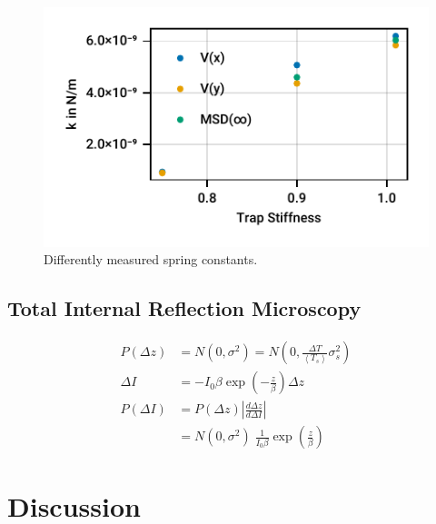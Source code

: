 \documentclass[
    parskip=half, 
    twoside=false,
    twocolumn=true,
    fontsize=11pt,
]{scrarticle}
\begin{document}
\begin{figure}
    \centering
    \includegraphics{figures/01_03_4_spring_constants.pdf}
    \caption{Differently measured spring constants.}
\end{figure}

\clearpage
\subsection{Total Internal Reflection Microscopy}
\begin{align}
    P(\Delta z) &= N(0, \sigma^2) = N\left(0, \frac{\Delta T}{\left<T_s\right>} \sigma_s^2\right)\\
    \Delta I &= - I_0 \beta \exp\left(-\frac{z}{\beta}\right) \Delta z \\
    P(\Delta I) &= P(\Delta z) \left|\frac{d \Delta z}{d \Delta I}\right|\\
    &= N(0, \sigma^2) \;\frac{1}{I_0\beta} \exp\left(\frac{z}{\beta}\right)
\end{align}


\clearpage
\section{Discussion}
\blindtext

\nocite{*}
\printbibliography
\end{document}
